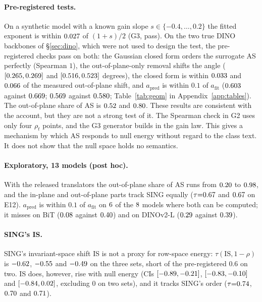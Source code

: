 \documentclass[10pt]{article}
\begin{document}
\paragraph{Pre-registered tests.}
On a synthetic model with a known gain slope $s\in\{-0.4,\dots,0.2\}$ the fitted exponent is within $0.027$ of $(1+s)/2$ (G3, pass).
On the two true DINO backbones of \S\ref{sec:dino}, which were not used to design the test, the pre-registered checks pass on both: the Gaussian closed form orders the surrogate AS perfectly (Spearman $1$), the out-of-plane-only removal shifts the angle ($[0.265,0.269]$ and $[0.516,0.523]$ degrees), the closed form is within $0.033$ and $0.066$ of the measured out-of-plane shift, and $a_{\mathrm{pred}}$ is within $0.1$ of $a_{\mathrm{fit}}$ ($0.603$ against $0.669$; $0.569$ against $0.580$; Table~\ref{tab:geom} in Appendix~\ref{app:tables}).
The out-of-plane share of AS is $0.52$ and $0.80$.
These results are consistent with the account, but they are not a strong test of it. The Spearman check in G2 uses only four $\rho_t$ points, and the G3 generator builds in the gain law.
This gives a mechanism by which AS responds to null energy without regard to the class text. It does not show that the null space holds no semantics.

\paragraph{Exploratory, 13 models (post hoc).}
With the released translators the out-of-plane share of AS runs from $0.20$ to $0.98$, and the in-plane and out-of-plane parts track SING equally ($\tau{=}0.67$ and $0.67$ on E12).
$a_{\mathrm{pred}}$ is within $0.1$ of $a_{\mathrm{fit}}$ on $6$ of the $8$ models where both can be computed; it misses on BiT ($0.08$ against $0.40$) and on DINOv2-L ($0.29$ against $0.39$).

\paragraph{SING's IS.}
SING's invariant-space shift IS is not a proxy for row-space energy: $\tau(\mathrm{IS},1{-}\rho)$ is $-0.62$, $-0.55$ and $-0.49$ on the three sets, short of the pre-registered $0.6$ on two.
IS does, however, rise with null energy (CIs $[-0.89,-0.21]$, $[-0.83,-0.10]$ and $[-0.84,0.02]$, excluding 0 on two sets), and it tracks SING's order ($\tau{=}0.74$, $0.70$ and $0.71$).
\end{document}
